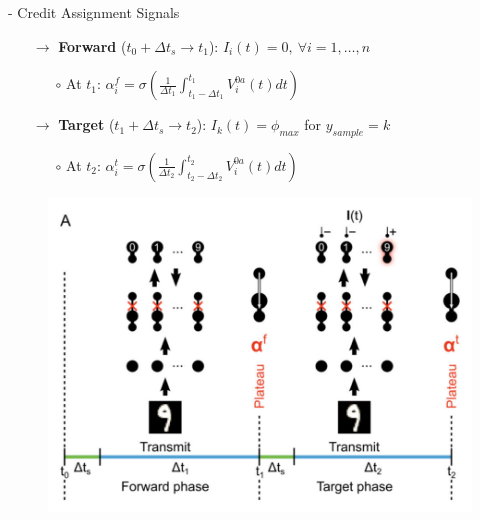\documentclass[dvipsnames, usenames]{beamer}
\begin{document}
\begin{frame}{\citet{guerguiev2017} - Credit Assignment Signals}

\begin{itemize}
	\item[$\to$] \textbf{Forward} ($t_0 + \Delta t_s \to t_1$): $I_i(t) = 0, \ \forall i=1,\dots, n$
	\begin{itemize}
		\item[$\circ$] At $t_1$: $\alpha_i^f = \sigma\left(\frac{1}{\Delta t_1} \int_{t_1 - \Delta t_1}^{t_1} V_i^{0a}(t)dt\right)$
	\end{itemize}
	\item[$\to$] \textbf{Target} ($t_1 + \Delta t_s \to t_2$): $I_k(t) = \phi_{max}$ for $y_{sample} = k$
	\begin{itemize}
		\item[$\circ$] At $t_2$: $\alpha_i^t = \sigma\left(\frac{1}{\Delta t_2} \int_{t_2 - \Delta t_2}^{t_2} V_i^{0a}(t)dt\right)$
	\end{itemize}
\end{itemize}
\pause
\begin{figure}
	\centering
	\includegraphics[scale=0.45]{../figures/report/phases}
\end{figure}
         

\end{frame}
\end{document}
